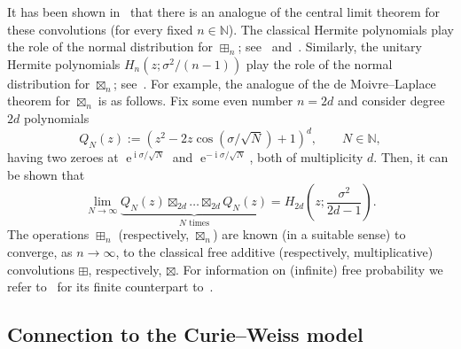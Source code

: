 \documentclass[AHL,Unicode,longabstracts,published]{cedram}
\DeclareMathOperator{\eee}{e}
\DeclareMathOperator{\ii}{i}
\newcommand{\N}{\mathbb{N}}
\begin{document}
It has been shown in~\cite{marcus,
mirabelli_diss,marcus_spielman_srivastava} that there is an analogue of the central limit theorem for these convolutions (for every fixed $n\in \N$). The classical Hermite polynomials play the role of the normal distribution for $\boxplus_n$; see~\cite[Theorem~6.7]{marcus} and~\cite[Theorems~3.2, 3.5]{mirabelli_diss}. Similarly, the unitary Hermite polynomials $H_n(z; \sigma^2/(n-1))$ play the role of the normal distribution for $\boxtimes_n$; see~\cite[Theorems~3.16, 3.23, 3.32]{mirabelli_diss}. For example, the analogue of the de Moivre--Laplace theorem for $\boxtimes_{n}$ is as follows. Fix some even number $n = 2d$ and consider degree~$2d$ polynomials
\[
Q_N(z) := \left(z^2 -2 z \cos (\sigma/\sqrt N) +1\right)^d, \qquad N\in \N,
\]
having two zeroes at $\eee^{\ii \sigma/ \sqrt N}$ and $\eee^{-\ii \sigma/ \sqrt N}$, both of multiplicity $d$. Then, it can be shown that
\[
\lim_{N\to\infty} \underbrace{Q_N(z) \boxtimes_{2d} \ldots \boxtimes_{2d} Q_N(z)}_{N \text{ times}} = H_{2d}\left(z; \frac{\sigma^2}{2d-1}\right).
\]
The operations $\boxplus_n$ (respectively, $\boxtimes_n$) are known (in a suitable sense) to converge, as $n\to\infty$, to the classical free additive (respectively, multiplicative) convolutions $\boxplus$, respectively, $\boxtimes$. For information on (infinite) free probability we refer to~\cite{nica_speicher_book,voiculescu_nica_dykema_book} for its finite counterpart to~\cite{arizmendi_perales,arizmendi_garza_vargas_perales,marcus,
mirabelli_diss,marcus_spielman_srivastava}.

\subsection{Connection to the Curie--Weiss model} 
\end{document}

